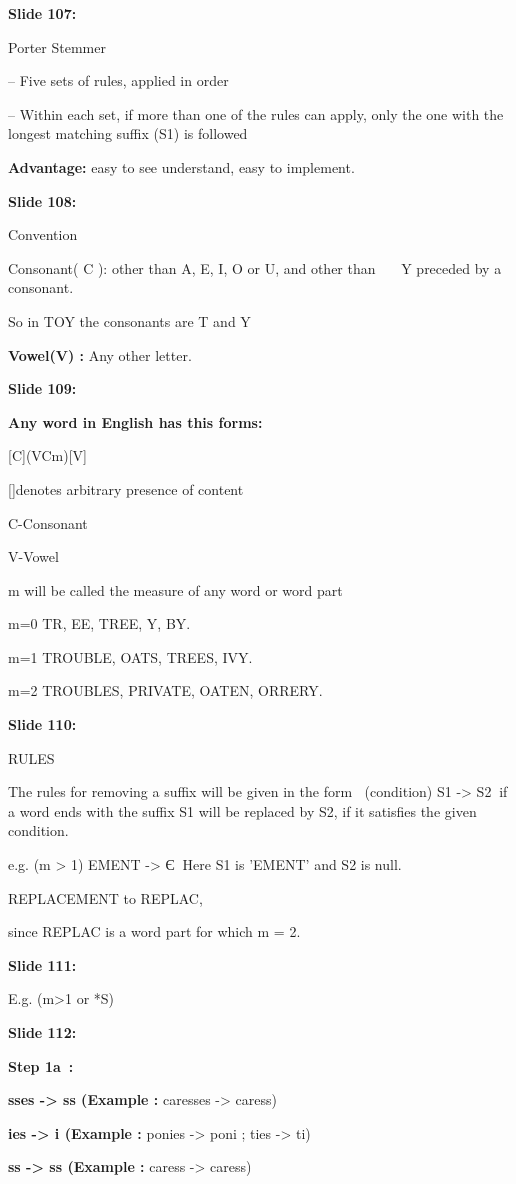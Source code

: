 \documentclass[11pt,a4paper]{article}
\begin{document}
\textbf{Slide 107:}

Porter Stemmer

– Five sets of rules, applied in order

– Within each set, if more than one of the rules can apply, only the one with the longest matching suffix (S1) is followed

\textbf{Advantage:}   easy to see understand, easy to implement.

\textbf{Slide 108:}

Convention

Consonant( C ): other than A, E, I, O or U, and other than    Y preceded by a consonant.

So in TOY the consonants are T and Y

\textbf{Vowel(V) :}  Any other letter.

\textbf{Slide 109:}

\textbf{Any word in English has this forms:} 

[C](VCm)[V]

[]denotes arbitrary presence of content

C-Consonant

V-Vowel

m will be called the measure of any word or word part

m=0 TR, EE, TREE, Y, BY.

m=1 TROUBLE, OATS, TREES, IVY.

m=2 TROUBLES, PRIVATE, OATEN, ORRERY.

\textbf{Slide 110:}

RULES

The rules for removing a suffix will be given in the form		(condition) S1 -> S2if a word ends with the suffix S1 will be replaced by S2, if it satisfies the given condition.

e.g.   (m > 1) EMENT -> ЄHere S1 is 'EMENT' and S2 is null.

REPLACEMENT to REPLAC,

since REPLAC is a word part for which m = 2.

\textbf{Slide 111:}

E.g. (m>1 or *S)

\textbf{Slide 112:}

\textbf{Step 1a :} 

\textbf{sses -> ss (Example :}  caresses -> caress)

\textbf{ies -> i (Example :}  ponies -> poni ; ties -> ti)

\textbf{ss -> ss (Example :}  caress -> caress)
\end{document}
